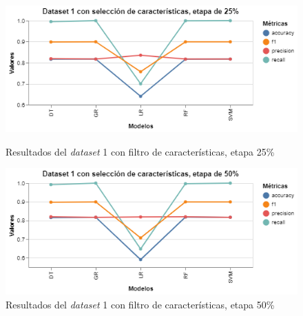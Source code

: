 \begin{figure}[htbp]
    \centering
    \begin{minipage}[t]{0.50\textwidth}
        \centering
        \includegraphics[width = \textwidth]{Graphics/dataset_1_fs_25.png}
        \caption{Resultados del \textit{dataset} 1 con filtro de características, etapa 25\%}
        \label{dataset1_fs_25}
    \end{minipage}\hfill
    \begin{minipage}[t]{0.50\textwidth}
        \centering
        \includegraphics[width = \textwidth]{Graphics/dataset_1_fs_50.png}
        \caption{Resultados del \textit{dataset} 1 con filtro de características, etapa 50\%}
        \label{dataset1_fs_50}
    \end{minipage}
\end{figure}

